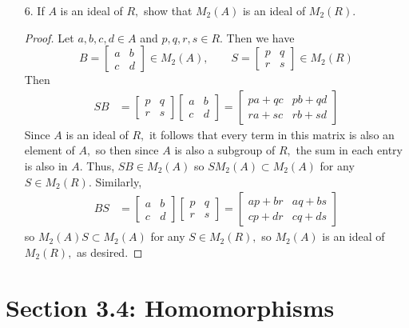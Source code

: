 \documentclass{article}
\begin{document}
\begin{itemize}
	\item[6.] If $A$ is an ideal of $R,$ show that $M_2(A)$ is an ideal of $M_2(R).$
		\begin{proof}
			Let $a, b, c, d\in A$ and $p, q, r, s\in R.$ Then we have \[B=\begin{bmatrix}
					a & b \\ c & d
				\end{bmatrix}\in M_2(A), \quad\quad S=\begin{bmatrix}
					p & q \\ r & s
			\end{bmatrix}\in M_2(R)\] Then 
			\begin{align*}
				SB &= \begin{bmatrix}
					p & q \\ r & s
				\end{bmatrix}\begin{bmatrix}
					a & b \\ c & d
				\end{bmatrix} = \begin{bmatrix}
					pa+qc & pb+qd \\
					ra+sc & rb+sd
				\end{bmatrix}
			\end{align*}
			Since $A$ is an ideal of $R,$ it follows that every term in this matrix is also an element of $A,$ so then since $A$ is also a subgroup of $R,$ the sum in each entry is also in $A.$ Thus, $SB\in M_2(A)$ so $SM_2(A)\subset M_2(A)$ for any $S\in M_2(R).$ Similarly,
			\begin{align*}
				BS &= \begin{bmatrix}
					a & b \\ c & d
				\end{bmatrix}\begin{bmatrix}
					p & q \\ r & s
				\end{bmatrix} = \begin{bmatrix}
					ap+br & aq+bs \\
					cp+dr & cq+ds
				\end{bmatrix}
			\end{align*}
			so $M_2(A)S\subset M_2(A)$ for any $S\in M_2(R),$ so $M_2(A)$ is an ideal of $M_2(R),$ as desired.
		\end{proof}
		
\end{itemize}

\section*{Section 3.4: Homomorphisms}
\end{document}
